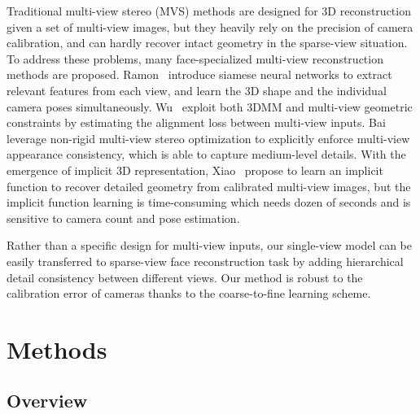\documentclass[10pt,twocolumn,letterpaper]{article}
\begin{document}
Traditional multi-view stereo (MVS) methods\cite{furukawa2009accurate, bradley2010high,beeler2010high} are designed for 3D reconstruction given a set of multi-view images, but they heavily rely on the precision of camera calibration, and can hardly recover intact geometry in the sparse-view situation. To address these problems, many face-specialized multi-view reconstruction methods\cite{ichim2015dynamic,dou2018multi,piotraschke2016automated,ramon2019multi,wu2019mvf,bai2020deep,xiao2022detailed} are proposed. Ramon~\etal\cite{ramon2019multi} introduce siamese neural networks to extract relevant features from each view, and learn the 3D shape and the individual camera poses simultaneously. Wu~\etal\cite{wu2019mvf} exploit both 3DMM and
multi-view geometric constraints by estimating the alignment loss between multi-view inputs. Bai~\etal\cite{bai2020deep} leverage non-rigid multi-view stereo optimization to explicitly enforce multi-view appearance consistency, which is able to capture medium-level details. With the emergence of implicit 3D representation,  Xiao~\etal\cite{xiao2022detailed} propose to learn an implicit function to recover detailed geometry from calibrated multi-view images, but the implicit function learning is time-consuming which needs dozen of seconds and is sensitive to camera count and pose estimation. 

Rather than a specific design for multi-view inputs, our single-view model can be easily transferred to sparse-view face reconstruction task by adding hierarchical detail consistency between different views. Our method is robust to the calibration error of cameras thanks to the coarse-to-fine learning scheme.



\section{Methods}

\subsection{Overview}
\end{document}

